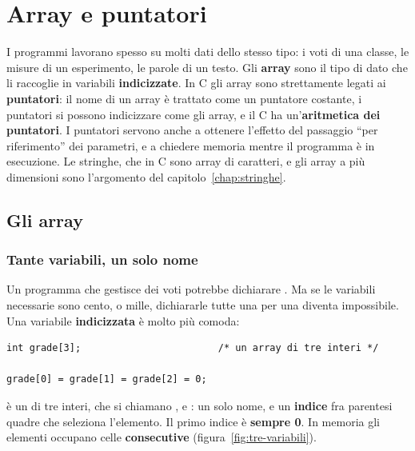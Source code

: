 \chapter{Array e puntatori}
\label{chap:puntatori}

I programmi lavorano spesso su molti dati dello stesso tipo: i voti di una
classe, le misure di un esperimento, le parole di un testo. Gli
\textbf{array} sono il tipo di dato che li raccoglie in variabili
\textbf{indicizzate}. In C gli array sono strettamente legati ai
\textbf{puntatori}: il nome di un array è trattato come un puntatore
costante, i puntatori si possono indicizzare come gli array, e il C ha
un'\textbf{aritmetica dei puntatori}. I puntatori servono anche a ottenere
l'effetto del passaggio “per riferimento” dei parametri, e a chiedere memoria
mentre il programma è in esecuzione. Le stringhe, che in C sono array di
caratteri, e gli array a più dimensioni sono l'argomento del
capitolo~\ref{chap:stringhe}.

\section{Gli array}

\subsection{Tante variabili, un solo nome}

Un programma che gestisce dei voti potrebbe dichiarare
. Ma se le variabili necessarie sono
cento, o mille, dichiararle tutte una per una diventa impossibile. Una
variabile \textbf{indicizzata} è molto più comoda:

\begin{lstlisting}[style=c]
int grade[3];                        /* un array di tre interi */

grade[0] = grade[1] = grade[2] = 0;
\end{lstlisting}

 è un  di tre interi, che si chiamano
,  e : un solo nome, e un
\textbf{indice} fra parentesi quadre che seleziona l'elemento. Il primo
indice è \textbf{sempre 0}. In memoria gli elementi occupano celle
\textbf{consecutive} (figura~\ref{fig:tre-variabili}).

